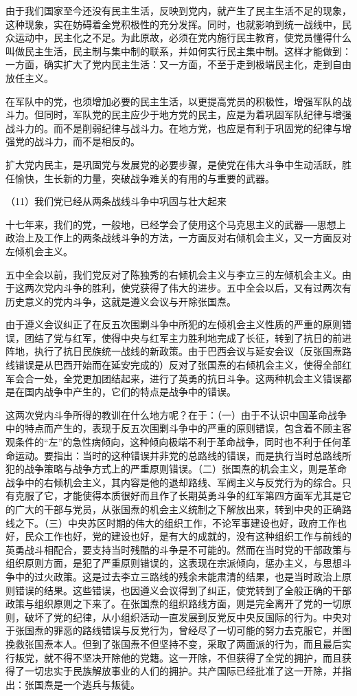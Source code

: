 \documentclass[UTF8, 12pt, a4paper]{ctexrep}
\begin{document}
由于我们国家至今还没有民主生活，反映到党内，就产生了民主生活不足的现象，这种现象，实在妨碍着全党积极性的充分发挥。同时，也就影响到统一战线中，民众运动中，民主化之不足。为此原故，必须在党内施行民主教育，使党员懂得什么叫做民主生活，民主制与集中制的联系，并如何实行民主集中制。这样才能做到：一方面，确实扩大了党内民主生活：又一方面，不至于走到极端民主化，走到自由放任主义。

在军队中的党，也须增加必要的民主生活，以更提高党员的积极性，增强军队的战斗力。但同时，军队党的民主应少于地方党的民主，应是为着巩固军队纪律与增强战斗力的。而不是削弱纪律与战斗力。在地方党，也应是有利于巩固党的纪律与增强党的战斗力，而不是相反的。

扩大党内民主，是巩固党与发展党的必要步骤，是使党在伟大斗争中生动活跃，胜任愉快，生长新的力量，突破战争难关的有用的与重要的武器。

（11）我们党已经从两条战线斗争中巩固与壮大起来

十七年来，我们的党，一般地，已经学会了使用这个马克思主义的武器──思想上政治上及工作上的两条战线斗争的方法，一方面反对右倾机会主义，又一方面反对左倾机会主义。

五中全会以前，我们党反对了陈独秀的右倾机会主义与李立三的左倾机会主义。由于这两次党内斗争的胜利，使党获得了伟大的进步。五中全会以后，又有过两次有历史意义的党内斗争，这就是遵义会议与开除张国焘。

由于遵义会议纠正了在反五次围剿斗争中所犯的左倾机会主义性质的严重的原则错误，团结了党与红军，使得中央与红军主力胜利地完成了长征，转到了抗日的前进阵地，执行了抗日民族统一战线的新政策。由于巴西会议与延安会议（反张国焘路线错误是从巴西开始而在延安完成的）反对了张国焘的右倾机会主义，使得全部红军会合一处，全党更加团结起来，进行了英勇的抗日斗争。这两种机会主义错误都是在国内战争中产生的，它们的特点是战争中的错误。

这两次党内斗争所得的教训在什么地方呢？在于：（一）由于不认识中国革命战争中的特点而产生的，表现于反五次围剿斗争中的严重的原则错误，包含着不顾主客观条件的“左”的急性病倾向，这种倾向极端不利于革命战争，同时也不利于任何革命运动。要指出：当时的这种错误并非党的总路线的错误，而是执行当时总路线所犯的战争策略与战争方式上的严重原则错误。（二）张国焘的机会主义，则是革命战争中的右倾机会主义，其内容是他的退却路线、军阀主义与反党行为的综合。只有克服了它，才能使得本质很好而且作了长期英勇斗争的红军第四方面军尤其是它的广大的干部与党员，从张国焘的机会主义统制之下解放出来，转到中央的正确路线之下。（三）中央苏区时期的伟大的组织工作，不论军事建设也好，政府工作也好，民众工作也好，党的建设也好，是有大的成就的，没有这种组织工作与前线的英勇战斗相配合，要支持当时残酷的斗争是不可能的。然而在当时党的干部政策与组织原则方面，是犯了严重原则错误的，这表现在宗派倾向，惩办主义，与思想斗争中的过火政策。这是过去李立三路线的残余未能肃清的结果，也是当时政治上原则错误的结果。这些错误，也因遵义会议得到了纠正，使党转到了全般正确的干部政策与组织原则之下来了。在张国焘的组织路线方面，则是完全离开了党的一切原则，破坏了党的纪律，从小组织活动一直发展到反党反中央反国际的行为。中央对于张国焘的罪恶的路线错误与反党行为，曾经尽了一切可能的努力去克服它，并图挽救张国焘本人。但到了张国焘不但坚持不变，采取了两面派的行为，而且最后实行叛党，就不得不坚决开除他的党籍。这一开除，不但获得了全党的拥护，而且获得了一切忠实于民族解放事业的人们的拥护。共产国际已经批准了这一开除，并指出：张国焘是一个逃兵与叛徒。
\end{document}
